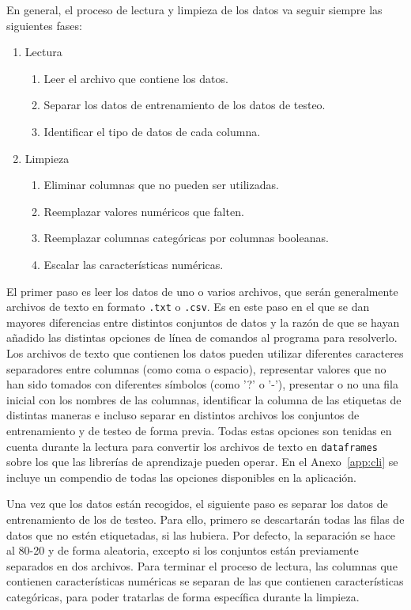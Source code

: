 En general, el proceso de lectura y limpieza de los datos va seguir siempre las siguientes fases:
\begin{enumerate}
    \item Lectura
    \begin{enumerate}
        \item Leer el archivo que contiene los datos.
        \item Separar los datos de entrenamiento de los datos de testeo.
        \item Identificar el tipo de datos de cada columna.
    \end{enumerate}
    \item Limpieza
    \begin{enumerate}
        \item Eliminar columnas que no pueden ser utilizadas.
        \item Reemplazar valores numéricos que falten.
        \item Reemplazar columnas categóricas por columnas booleanas.
        \item Escalar las características numéricas.
    \end{enumerate}
\end{enumerate}

El primer paso es leer los datos de uno o varios archivos, que serán generalmente archivos de texto en formato \texttt{.txt} o \texttt{.csv}. Es en este paso en el que se dan mayores diferencias entre distintos conjuntos de datos y la razón de que se hayan añadido las distintas opciones de línea de comandos al programa para resolverlo. Los archivos de texto que contienen los datos pueden utilizar diferentes caracteres separadores entre columnas (como coma o espacio), representar valores que no han sido tomados con diferentes símbolos (como '?' o '-'), presentar o no una fila inicial con los nombres de las columnas, identificar la columna de las etiquetas de distintas maneras e incluso separar en distintos archivos los conjuntos de entrenamiento y de testeo de forma previa. Todas estas opciones son tenidas en cuenta durante la lectura para convertir los archivos de texto en \texttt{dataframes} sobre los que las librerías de aprendizaje pueden operar. En el Anexo~\ref{app:cli} se incluye un compendio de todas las opciones disponibles en la aplicación.

Una vez que los datos están recogidos, el siguiente paso es separar los datos de entrenamiento de los de testeo. Para ello, primero se descartarán todas las filas de datos que no estén etiquetadas, si las hubiera. Por defecto, la separación se hace al 80-20 y de forma aleatoria, excepto si los conjuntos están previamente separados en dos archivos. Para terminar el proceso de lectura, las columnas que contienen características numéricas se separan de las que contienen características categóricas, para poder tratarlas de forma específica durante la limpieza.

